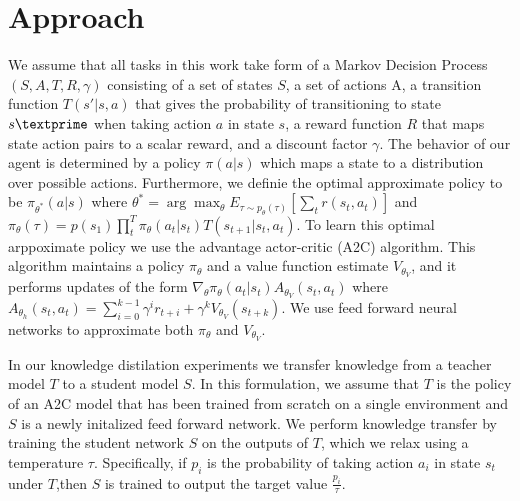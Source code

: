 \section{Approach}
We assume that all tasks in this work take form of a Markov Decision Process $(S, A, T, R, \gamma)$ consisting of
a set of states $S$, a set of actions A, a transition function $T(s' \vert s, a)$ that gives the
probability of transitioning to state $s \textprime$ when taking action $a$ in state $s$, a reward function
$R$ that maps state action pairs to a scalar reward, and a discount factor $\gamma$. The behavior of our
agent is determined by a policy $\pi(a \vert s)$ which maps a state to a distribution over possible actions.
Furthermore, we definie the optimal approximate policy to be $\pi_{\theta^*}(a \vert s)$ where
$\theta^* = \arg\max_{\theta} E_{\tau \sim p_\theta(\tau)}[\sum_t r(s_t, a_t)]$ and
$\pi_\theta(\tau) = p(s_1) \prod_t^T \pi_\theta(a_t \vert s_t)T(s_{t+1} \vert s_t, a_t)$.
To learn this optimal arppoximate policy we use the advantage actor-critic (A2C) algorithm.
This algorithm maintains a policy $\pi_\theta$ and a value function estimate $V_{\theta_V}$,
and it performs updates of the form $\nabla_\theta \pi_\theta(a_t \vert s_t)A_{\theta_V}(s_t, a_t)$
where $A_{\theta_h}(s_t, a_t) = \sum_{i=0}^{k-1} \gamma^ir_{t+i} + \gamma^kV_{\theta_V}(s_{t+k})$.
We use feed forward neural networks to approximate both $\pi_\theta$ and $V_{\theta_V}$.

In our knowledge distilation experiments we transfer knowledge from a teacher model $T$ to a
student model $S$. In this formulation, we assume that $T$ is the policy of an A2C model that
has been trained from scratch on a single environment and $S$ is a newly initalized feed forward network. 
We perform knowledge transfer by training the student network $S$ on the outputs of $T$, 
which we relax using a temperature $\tau$. Specifically, if $p_i$ is the probability of taking action 
$a_i$ in state $s_t$ under $T$,then $S$ is trained to output the target value $\frac{p_i}{\tau}$.

